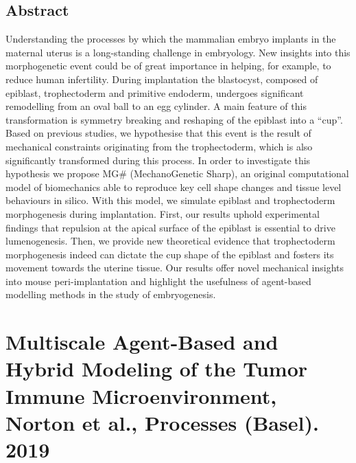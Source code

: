 \documentclass[11pt,a4paper]{article}
\begin{document}
\subsection*{Abstract}
Understanding the processes by which the mammalian embryo implants in the maternal uterus is a long-standing challenge in embryology. New insights into this morphogenetic event could be of great importance in helping, for example, to reduce human infertility. During implantation the blastocyst, composed of epiblast, trophectoderm and primitive endoderm, undergoes significant remodelling from an oval ball to an egg cylinder. A main feature of this transformation is symmetry breaking and reshaping of the epiblast into a “cup”. Based on previous studies, we hypothesise that this event is the result of mechanical constraints originating from the trophectoderm, which is also significantly transformed during this process. In order to investigate this hypothesis we propose MG\# (MechanoGenetic Sharp), an original computational model of biomechanics able to reproduce key cell shape changes and tissue level behaviours in silico. With this model, we simulate epiblast and trophectoderm morphogenesis during implantation. First, our results uphold experimental findings that repulsion at the apical surface of the epiblast is essential to drive lumenogenesis. Then, we provide new theoretical evidence that trophectoderm morphogenesis indeed can dictate the cup shape of the epiblast and fosters its movement towards the uterine tissue. Our results offer novel mechanical insights into mouse peri-implantation and highlight the usefulness of agent-based modelling methods in the study of embryogenesis.

\section*{Multiscale Agent-Based and Hybrid Modeling of the Tumor Immune Microenvironment, Norton et al., Processes (Basel). 2019}
\end{document}

